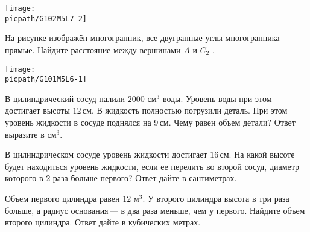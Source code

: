 \begin{class}[number=2]
\begin{listofex}
		\begin{minipage}[t]{\picwidth}
			\texttt{[image: \\picpath/G102M5L7-2]}
		\end{minipage}
		\item 
		\begin{minipage}[t]{\bodywidth}
			На рисунке изображён многогранник, все двугранные углы многогранника прямые. Найдите расстояние между вершинами \(A\) и \(C_2\) .
		\end{minipage}
		\hspace{0.02\linewidth}
		\begin{minipage}[t]{\picwidth}
			\texttt{[image: \\picpath/G101M5L6-1]}
		\end{minipage}
		\item В цилиндрический сосуд налили \(2000\) см\(^3\) воды. Уровень воды при этом достигает высоты \(12\) см. В жидкость полностью погрузили деталь. При этом уровень жидкости в сосуде поднялся на \(9\) см. Чему равен объем детали? Ответ выразите в см\(^3\).
		\item В цилиндрическом сосуде уровень жидкости достигает \(16\) см. На какой высоте будет находиться уровень жидкости, если ее перелить во второй сосуд, диаметр которого в \(2\) раза больше первого? Ответ дайте в сантиметрах.
		\item Объем первого цилиндра равен \(12\) м\(^3\). У второго цилиндра высота в три раза больше, а радиус основания --- в два раза меньше, чем у первого. Найдите объем второго цилиндра. Ответ дайте в кубических метрах.

\end{listofex}
\end{class}
